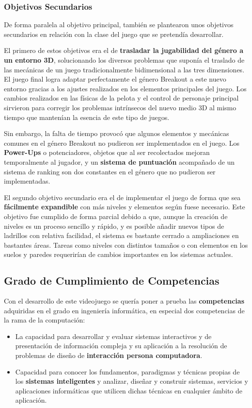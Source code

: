 \subsubsection{Objetivos Secundarios}
De forma paralela al objetivo principal, también se plantearon unos objetivos secundarios en relación con la clase del juego que se pretendía desarrollar. 

El primero de estos objetivos era el de \textbf{trasladar la jugabilidad del género a un entorno 3D}, solucionando los diversos problemas que suponía el traslado de las mecánicas de un juego tradicionalmente bidimensional a las tres dimensiones. El juego final logra adaptar perfectamente el género Breakout a este nuevo entorno gracias a los ajustes realizados en los elementos principales del juego. Los cambios realizados en las físicas de la pelota y el control de personaje principal sirvieron para corregir los problemas intrínsecos del nuevo medio 3D al mismo tiempo que mantenían la esencia de este tipo de juegos.

Sin embargo, la falta de tiempo provocó que algunos elementos y mecánicas comunes en el género Breakout no pudieron ser implementados en el juego. Los \textbf{Power-Ups} o potenciadores, objetos que al ser recolectados mejoran temporalmente al jugador, y un \textbf{sistema de puntuación} acompañado de un sistema de ranking son dos constantes en el género que no pudieron ser implementadas.

El segundo objetivo secundario era el de implementar el juego de forma que sea \textbf{fácilmente expandible} con más niveles y elementos según fuese necesario. Este objetivo fue cumplido de forma parcial debido a que, aunque la creación de niveles es un proceso sencillo y rápido, y es posible añadir nuevos tipos de ladrillos con relativa facilidad, el sistema es bastante cerrado a ampliaciones en bastantes áreas. Tareas como niveles con distintos tamaños o con elementos en los suelos y paredes requerirían de cambios importantes en los sistemas actuales. 

\subsection{Grado de Cumplimiento de Competencias}
Con el desarrollo de este videojuego se quería poner a prueba las \textbf{competencias} adquiridas en el grado en ingeniería informática, en especial dos competencias de la rama de la computación: 
\begin{itemize}
\item La capacidad para desarrollar y evaluar sistemas interactivos y de presentación de información compleja y su aplicación a la resolución de problemas de diseño de \textbf{interacción persona computadora}. 
\item Capacidad para conocer los fundamentos, paradigmas y técnicas propias de los \textbf{sistemas inteligentes} y analizar, diseñar y construir sistemas, servicios y aplicaciones informáticas que utilicen dichas técnicas en cualquier ámbito de aplicación. 
\end{itemize}

